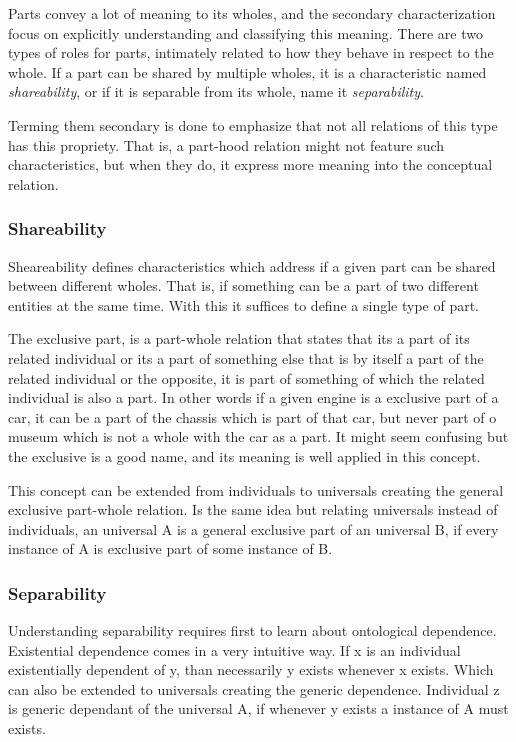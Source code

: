 Parts convey a lot of meaning to its wholes, and the secondary characterization focus on explicitly understanding and classifying this meaning. There are two types of roles for parts, intimately related to how they behave in respect to the whole. If a part can be shared by multiple wholes, it is a characteristic named \textit{shareability}, or if it is separable from its whole, name it \textit{separability}.

Terming them secondary is done to emphasize that not all relations of this type has this propriety. That is, a part-hood relation might not feature such characteristics, but when they do, it express more meaning into the conceptual relation.

\subsubsection{Shareability}

Sheareability defines characteristics which address if a given part can be shared between different wholes. That is, if something can be a part of two different entities at the same time. With this it suffices to define a single type of part. 

The exclusive part, is a part-whole relation that states that its a part of its related individual or its a part of something else that is by itself a part of the related individual or the opposite, it is part of something of which the related individual is also a part. In other words if a given engine is a exclusive part of a car, it can be a part of the chassis which is part of that car, but never part of o museum which is not a whole with the car as a part. It might seem confusing but the exclusive is a good name, and its meaning is well applied in this concept.

This concept can be extended from individuals to universals creating the general exclusive part-whole relation. Is the same idea but relating universals instead of individuals, an universal A is a general exclusive part of an universal B, if every instance of A is exclusive part of some instance of B.

\subsubsection{Separability}

Understanding separability requires first to learn about ontological dependence. Existential dependence comes in a very intuitive way. If x is an individual existentially dependent of y, than necessarily y exists whenever x exists. Which can also be extended to universals creating the generic dependence. Individual z is generic dependant of the universal A, if whenever y exists a instance of A must exists.


